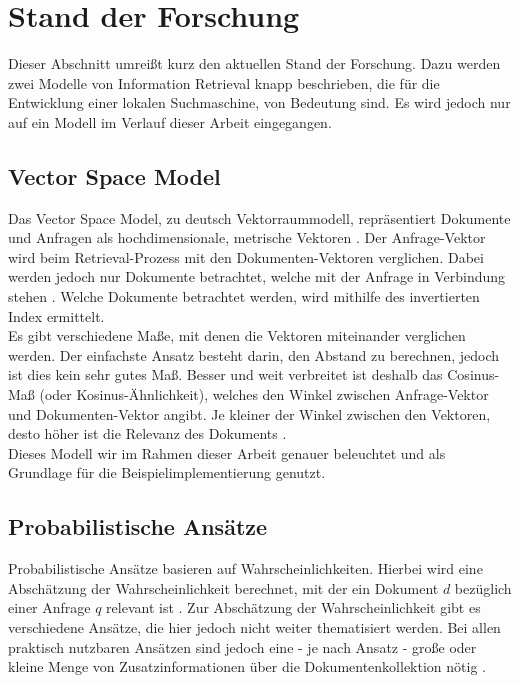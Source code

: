 \section{Stand der Forschung}
Dieser Abschnitt umreißt kurz den aktuellen Stand der Forschung. Dazu werden zwei Modelle von Information Retrieval knapp beschrieben, die für die Entwicklung einer lokalen Suchmaschine, von Bedeutung sind. Es wird jedoch nur auf ein Modell im Verlauf dieser Arbeit eingegangen.
\\

\subsection{Vector Space Model}
Das Vector Space Model, zu deutsch Vektorraummodell, repräsentiert Dokumente und Anfragen als hochdimensionale, metrische Vektoren \cite{VR_Retrieval}.
Der Anfrage-Vektor wird beim Retrieval-Prozess mit den Dokumenten-Vektoren verglichen. Dabei werden jedoch nur Dokumente betrachtet, welche mit der Anfrage in Verbindung stehen \cite{klass_IR}. Welche Dokumente betrachtet werden, wird mithilfe des invertierten Index ermittelt.
\\
Es gibt verschiedene Maße, mit denen die Vektoren miteinander verglichen werden. Der einfachste Ansatz besteht darin, den Abstand zu berechnen, jedoch ist dies kein sehr gutes Maß. Besser und weit verbreitet ist deshalb das Cosinus-Maß (oder Kosinus-Ähnlichkeit), welches den Winkel zwischen Anfrage-Vektor und Dokumenten-Vektor angibt. Je kleiner der Winkel zwischen den Vektoren, desto höher ist die Relevanz des Dokuments \cite{IR_Uni_Duisburg}.
\\
Dieses Modell wir im Rahmen dieser Arbeit genauer beleuchtet und als Grundlage für die Beispielimplementierung genutzt.

\subsection{Probabilistische Ansätze}
Probabilistische Ansätze basieren auf Wahrscheinlichkeiten. Hierbei wird eine Abschätzung der Wahrscheinlichkeit berechnet, mit der ein Dokument $d$ bezüglich einer Anfrage $q$ relevant ist \cite{IR_Uni_Duisburg}. Zur Abschätzung der Wahrscheinlichkeit gibt es verschiedene Ansätze, die hier jedoch nicht weiter thematisiert werden. Bei allen praktisch nutzbaren Ansätzen sind jedoch eine - je nach Ansatz - große oder kleine Menge von Zusatzinformationen über die Dokumentenkollektion nötig \cite{IR_Uni_Duisburg}.